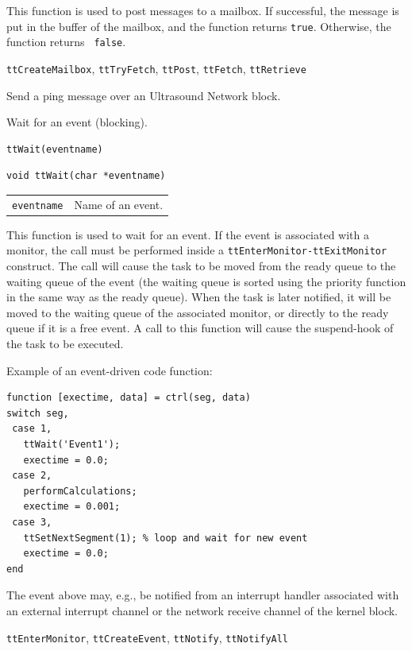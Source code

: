 \documentclass[final,twoside]{rapport}
\begin{document}
\descr This function is used to post messages to a mailbox. If
successful, the message is put in the buffer of the mailbox, and the
function returns {\tt true}. Otherwise, the function returns {\tt
  false}.

\seealso
{\tt ttCreateMailbox}, {\tt ttTryFetch}, {\tt ttPost},
{\tt ttFetch}, {\tt ttRetrieve}




\purpose
Send a ping message over an Ultrasound Network block.



\purpose
Wait for an event (blocking).

\Msyntax
\begin{verbatim}
ttWait(eventname) 
\end{verbatim}

\Csyntax
\begin{verbatim}
void ttWait(char *eventname)
\end{verbatim}

\args
\begin{tabularx}{\hsize}{l>{\raggedright\arraybackslash}X}
  {\tt eventname} & Name of an event.
\end{tabularx}

\descr This function is used to wait for an event. If the event is
associated with a monitor, the call must be performed inside a
\texttt{ttEnterMonitor-ttExitMonitor} construct. The call will cause
the task to be moved from the ready queue to the waiting queue of the
event (the waiting queue is sorted using the priority function in the
same way as the ready queue). When the task is later notified, it will
be moved to the waiting queue of the associated monitor, or directly
to the ready queue if it is a free event. A call to this function will
cause the suspend-hook of the task to be executed.

\example Example of an event-driven code function:

\begin{small}
\begin{verbatim}
function [exectime, data] = ctrl(seg, data)
switch seg,
 case 1, 
   ttWait('Event1');
   exectime = 0.0;
 case 2,
   performCalculations;
   exectime = 0.001;
 case 3,
   ttSetNextSegment(1); % loop and wait for new event
   exectime = 0.0;
end
\end{verbatim}
\end{small}

The event above may, e.g., be notified from an interrupt handler
associated with an external interrupt channel or the network receive
channel of the kernel block.

\seealso
{\tt ttEnterMonitor}, {\tt ttCreateEvent}, {\tt ttNotify}, {\tt ttNotifyAll}


\clearpage


\end{document}
